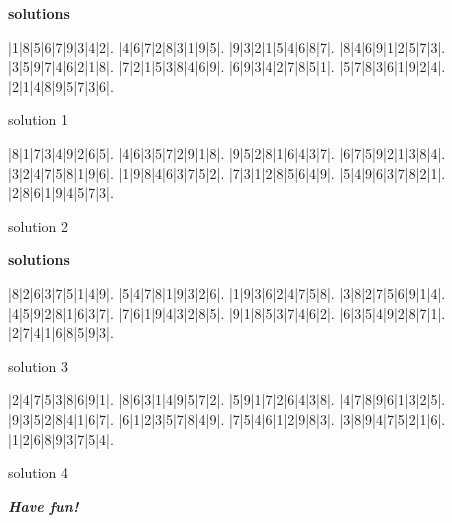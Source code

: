 \documentclass[fontsize=24pt,letterpaper]{scrartcl}
\renewcommand*\sudokuformat[1]{\Large\sffamily#1}
\begin{document}
{\Large \bfseries \sffamily solutions}
\setlength\sudokusize{8cm}
\renewcommand*\sudokuformat[1]{\sffamily#1}
\vspace{1cm}
\begin{sudoku}
|1|8|5|6|7|9|3|4|2|.
|4|6|7|2|8|3|1|9|5|.
|9|3|2|1|5|4|6|8|7|.
|8|4|6|9|1|2|5|7|3|.
|3|5|9|7|4|6|2|1|8|.
|7|2|1|5|3|8|4|6|9|.
|6|9|3|4|2|7|8|5|1|.
|5|7|8|3|6|1|9|2|4|.
|2|1|4|8|9|5|7|3|6|.
\end{sudoku}
\begin{center}
    solution 1
\end{center}
\vspace{0.2cm}
\begin{sudoku}
|8|1|7|3|4|9|2|6|5|.
|4|6|3|5|7|2|9|1|8|.
|9|5|2|8|1|6|4|3|7|.
|6|7|5|9|2|1|3|8|4|.
|3|2|4|7|5|8|1|9|6|.
|1|9|8|4|6|3|7|5|2|.
|7|3|1|2|8|5|6|4|9|.
|5|4|9|6|3|7|8|2|1|.
|2|8|6|1|9|4|5|7|3|.
\end{sudoku}
\begin{center}
    solution 2
\end{center}


\clearpage
\begin{flushright}
{\Large \bfseries \sffamily solutions}
\end{flushright}
\vspace{1cm}
\begin{sudoku}
|8|2|6|3|7|5|1|4|9|.
|5|4|7|8|1|9|3|2|6|.
|1|9|3|6|2|4|7|5|8|.
|3|8|2|7|5|6|9|1|4|.
|4|5|9|2|8|1|6|3|7|.
|7|6|1|9|4|3|2|8|5|.
|9|1|8|5|3|7|4|6|2|.
|6|3|5|4|9|2|8|7|1|.
|2|7|4|1|6|8|5|9|3|.
\end{sudoku}
\begin{center}
    solution 3
\end{center}
\begin{sudoku}
|2|4|7|5|3|8|6|9|1|.
|8|6|3|1|4|9|5|7|2|.
|5|9|1|7|2|6|4|3|8|.
|4|7|8|9|6|1|3|2|5|.
|9|3|5|2|8|4|1|6|7|.
|6|1|2|3|5|7|8|4|9|.
|7|5|4|6|1|2|9|8|3|.
|3|8|9|4|7|5|2|1|6|.
|1|2|6|8|9|3|7|5|4|.
\end{sudoku}
\begin{center}
    solution 4
\end{center}
\clearpage

{\centering\Huge\itshape\bfseries Have fun!\par}
\end{document}
